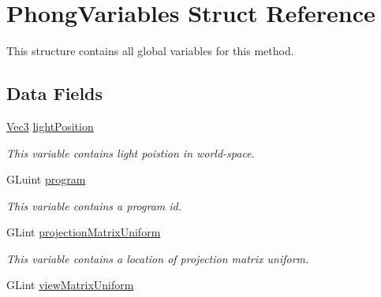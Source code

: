 \hypertarget{structPhongVariables}{}\section{Phong\+Variables Struct Reference}
\label{structPhongVariables}


This structure contains all global variables for this method.  


\subsection*{Data Fields}
\begin{DoxyCompactItemize}
\item 
\hypertarget{structPhongVariables_aab37c6c27bf6eac7d326a34afb74c90c}{}\hyperlink{structVec3}{Vec3} \hyperlink{structPhongVariables_aab37c6c27bf6eac7d326a34afb74c90c}{light\+Position}\label{structPhongVariables_aab37c6c27bf6eac7d326a34afb74c90c}

\begin{DoxyCompactList}\small\item\em This variable contains light poistion in world-\/space. \end{DoxyCompactList}\item 
\hypertarget{structPhongVariables_a79e282dccbf349a3aac5ff84a28816f9}{}G\+Luint \hyperlink{structPhongVariables_a79e282dccbf349a3aac5ff84a28816f9}{program}\label{structPhongVariables_a79e282dccbf349a3aac5ff84a28816f9}

\begin{DoxyCompactList}\small\item\em This variable contains a program id. \end{DoxyCompactList}\item 
\hypertarget{structPhongVariables_a8c61b1c9c38e80b57a13b0f87807374f}{}G\+Lint \hyperlink{structPhongVariables_a8c61b1c9c38e80b57a13b0f87807374f}{projection\+Matrix\+Uniform}\label{structPhongVariables_a8c61b1c9c38e80b57a13b0f87807374f}

\begin{DoxyCompactList}\small\item\em This variable contains a location of projection matrix uniform. \end{DoxyCompactList}\item 
\hypertarget{structPhongVariables_abbfc97af1616e8af7f792bbb54f39a50}{}G\+Lint \hyperlink{structPhongVariables_abbfc97af1616e8af7f792bbb54f39a50}{view\+Matrix\+Uniform}\label{structPhongVariables_abbfc97af1616e8af7f792bbb54f39a50}


\end{DoxyCompactItemize}
